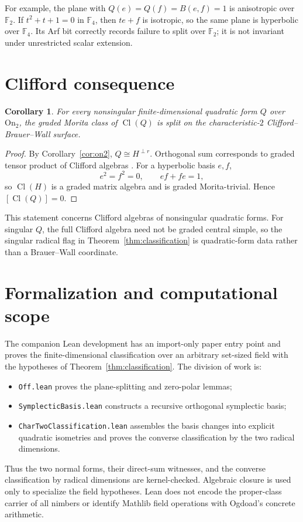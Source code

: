\documentclass[11pt]{article}
\newtheorem{corollary}[theorem]{Corollary}
\theoremstyle{definition}
\theoremstyle{remark}
\newcommand{\F}{\mathbb{F}}
\newcommand{\On}{\mathrm{On}_2}
\newcommand{\Cl}{\operatorname{Cl}}
\begin{document}
For example, the plane with $Q(e)=Q(f)=B(e,f)=1$ is anisotropic over $\F_2$.
If $t^2+t+1=0$ in $\F_4$, then $te+f$ is isotropic, so the same plane is
hyperbolic over $\F_4$.  Its Arf bit correctly records failure to
split over $\F_2$; it is not invariant under unrestricted scalar extension.

\section{Clifford consequence}

\begin{corollary}\label{cor:clifford}
For every nonsingular finite-dimensional quadratic form $Q$ over $\On$, the
graded Morita class of $\Cl(Q)$ is split on the characteristic-$2$
Clifford--Brauer--Wall surface.
\end{corollary}

\begin{proof}
By Corollary~\ref{cor:on2}, $Q\cong H^{\perp r}$.  Orthogonal sum corresponds
to graded tensor product of Clifford algebras
\cite[Chapter~IX]{elmankarpenkomerkurjev2008}.  For a hyperbolic basis $e,f$,
\[
  e^2=f^2=0,\qquad ef+fe=1,
\]
so $\Cl(H)$ is a graded matrix algebra and is graded Morita-trivial.  Hence
$[\Cl(Q)]=0$.
\end{proof}

This statement concerns Clifford algebras of nonsingular quadratic forms.
For singular $Q$, the full Clifford algebra need not be graded central simple,
so the singular radical flag in Theorem~\ref{thm:classification} is
quadratic-form data rather than a Brauer--Wall coordinate.

\section{Formalization and computational scope}

The companion Lean development \cite{ogdoad2026} has an import-only paper
entry point and proves the
finite-dimensional classification over an arbitrary set-sized field with the
hypotheses of Theorem~\ref{thm:classification}.  The division of work is:
\begin{itemize}
\item \texttt{Off.lean} proves the plane-splitting and zero-polar lemmas;
\item \texttt{SymplecticBasis.lean} constructs a recursive orthogonal
      symplectic basis;
\item \texttt{CharTwoClassification.lean} assembles the basis changes into
      explicit quadratic isometries and proves the converse classification by
      the two radical dimensions.
\end{itemize}
Thus the two normal forms, their direct-sum witnesses, and the converse
classification by radical dimensions are kernel-checked.  Algebraic closure
is used only to specialize the field hypotheses.  Lean does not encode the
proper-class carrier of all nimbers or identify Mathlib field operations with
Ogdoad's concrete arithmetic.
\end{document}
